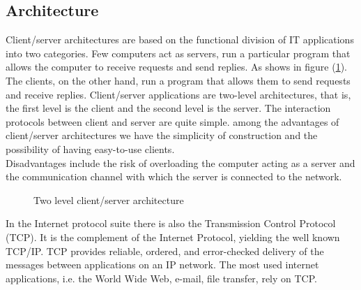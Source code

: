 \subsection{Architecture}
\label{ssec:soft-client-server}
Client/server architectures are based on the functional division of IT
applications into two categories. Few computers act as servers, run a particular
program that allows the computer to receive requests and send replies.
As shows in figure (\ref{fig:client-server architecture}).\hfill \break
The clients, on the other hand, run a program that allows them to send requests and
receive replies. Client/server applications are two-level architectures, that
is, the first level is the client and the second level is the server. The
interaction protocols between client and server are quite simple. among the
advantages of client/server architectures we have the simplicity of
construction and the possibility of having easy-to-use clients.\\ 
Disadvantages include the risk of overloading the computer acting as a server 
and the communication channel with which the server is connected to the network.\cite{mandrioli2008informatica}\hfill \break
%
%
\begin{figure}[ht]
	\centering
	\resizebox{0.65\textwidth}{!}{}
	\caption{Two level client/server architecture} 
	\label{fig:client-server architecture}
\end{figure}
%
\newline In the Internet protocol suite there is also the Transmission Control Protocol
(TCP). It is the complement of the Internet Protocol, yielding the well known
TCP/IP. TCP provides reliable, ordered, and error-checked delivery of the
messages between applications on an IP network. The most used internet
applications, i.e. the World Wide Web, e-mail, file transfer, rely on TCP.
%
